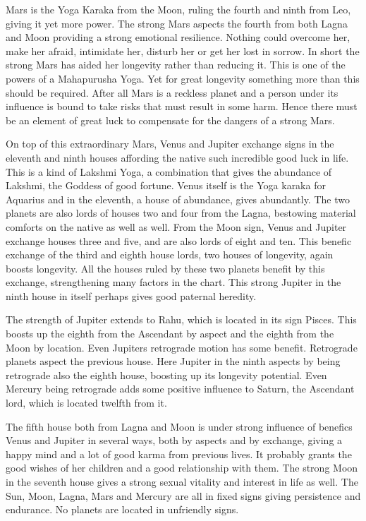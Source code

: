 Mars is the Yoga Karaka from the Moon, ruling the fourth and ninth from Leo, giving it yet more power. The strong Mars aspects the fourth from both Lagna and Moon providing a strong emotional resilience. Nothing could overcome her, make her afraid, intimidate her, disturb her or get her lost in sorrow. In short the strong Mars has aided her longevity rather than reducing it. This is one of the powers of a Mahapurusha Yoga. Yet for great longevity something more than this should be required. After all Mars is a reckless planet and a person under its influence is bound to take risks that must result in some harm. Hence there must be an element of great luck to compensate for the dangers of a strong Mars.

 

On top of this extraordinary Mars, Venus and Jupiter exchange signs in the eleventh and ninth houses affording the native such incredible good luck in life. This is a kind of Lakshmi Yoga, a combination that gives the abundance of Lakshmi, the Goddess of good fortune. Venus itself is the Yoga karaka for Aquarius and in the eleventh, a house of abundance, gives abundantly. The two planets are also lords of houses two and four from the Lagna, bestowing material comforts on the native as well as well. From the Moon sign, Venus and Jupiter exchange houses three and five, and are also lords of eight and ten. This benefic exchange of the third and eighth house lords, two houses of longevity, again boosts longevity. All the houses ruled by these two planets benefit by this exchange, strengthening many factors in the chart. This strong Jupiter in the ninth house in itself perhaps gives good paternal heredity.

 

The strength of Jupiter extends to Rahu, which is located in its sign Pisces. This boosts up the eighth from the Ascendant by aspect and the eighth from the Moon by location. Even Jupiters retrograde motion has some benefit. Retrograde planets aspect the previous house. Here Jupiter in the ninth aspects by being retrograde also the eighth house, boosting up its longevity potential. Even Mercury being retrograde adds some positive influence to Saturn, the Ascendant lord, which is located twelfth from it.

 

The fifth house both from Lagna and Moon is under strong influence of benefics Venus and Jupiter in several ways, both by aspects and by exchange, giving a happy mind and a lot of good karma from previous lives. It probably grants the good wishes of her children and a good relationship with them. The strong Moon in the seventh house gives a strong sexual vitality and interest in life as well. The Sun, Moon, Lagna, Mars and Mercury are all in fixed signs giving persistence and endurance. No planets are located in unfriendly signs.

